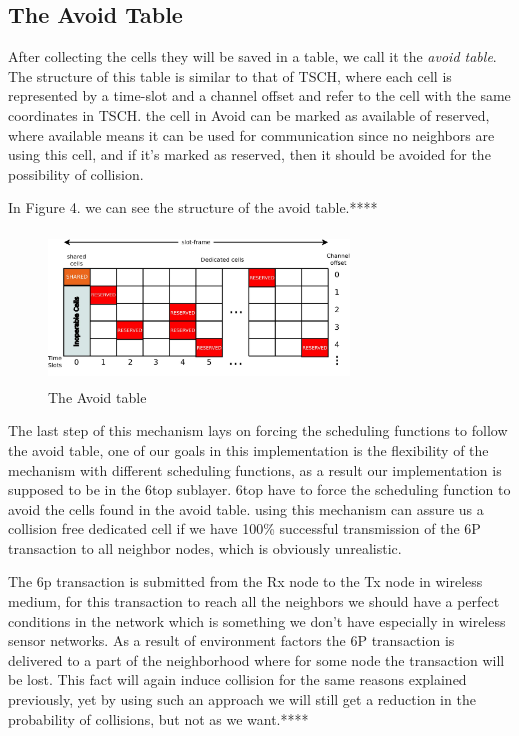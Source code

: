 \documentclass[10pt, conference, compsocconf]{IEEEtran}
\begin{document}
\subsection{The Avoid Table}

After collecting the cells they will be saved in a table, we call it the {\em avoid table}. The structure of this table is similar to that of TSCH, where each cell is represented by a time-slot and a channel offset and refer to the cell with the same coordinates in TSCH. the cell in Avoid can be marked as available of reserved, where available means it can be used for communication since no neighbors are using this cell, and if it's marked as reserved, then it should be avoided for the possibility of collision.

In Figure 4. we can see the structure of the avoid table.****


 
\begin{figure}[h]
    \centering
    \includegraphics[width=8cm, height=4cm]{avoid.jpeg}
    \caption{The Avoid table}
    \label{fig:Collision in 6TiSCH Networks}
\end{figure}

The last step of this mechanism lays on forcing the scheduling functions to follow the avoid table, one of our goals in this implementation is the flexibility of the mechanism with different  scheduling functions, as a result our implementation is supposed to be in the 6top sublayer. 6top have to force the scheduling function to avoid the cells found in the avoid table. using this mechanism can assure us a collision free dedicated cell if we have 100\% successful transmission of the 6P transaction to all neighbor nodes, which is obviously unrealistic.

The 6p transaction is submitted from the Rx node to the Tx node in wireless medium, for this transaction to reach all the neighbors we should have a perfect conditions in the network which is something we don't have especially in wireless sensor networks. As a result of environment factors the 6P transaction is delivered to a part of the neighborhood where for some node the transaction will be lost. This fact will again induce collision for the same reasons explained previously, yet by using such an approach we will still get a reduction in the probability of collisions, but not as we want.**** 
\end{document}
